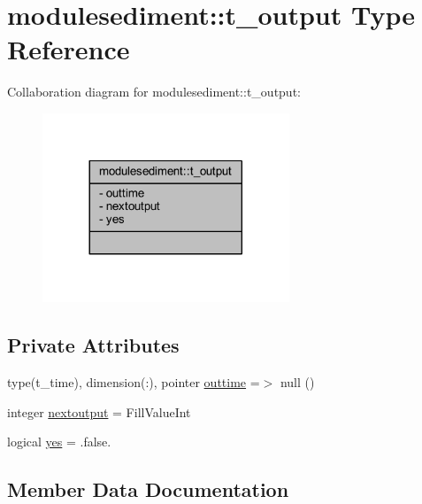 \hypertarget{structmodulesediment_1_1t__output}{}\section{modulesediment\+:\+:t\+\_\+output Type Reference}
\label{structmodulesediment_1_1t__output}


Collaboration diagram for modulesediment\+:\+:t\+\_\+output\+:\nopagebreak
\begin{figure}[H]
\begin{center}
\leavevmode
\includegraphics[width=209pt]{structmodulesediment_1_1t__output__coll__graph}
\end{center}
\end{figure}
\subsection*{Private Attributes}
\begin{DoxyCompactItemize}
\item 
type(t\+\_\+time), dimension(\+:), pointer \mbox{\hyperlink{structmodulesediment_1_1t__output_a1cd979d34cf8f4ee4afcbef5566acf6d}{outtime}} =$>$ null ()
\item 
integer \mbox{\hyperlink{structmodulesediment_1_1t__output_a9c4b08007adb655b8633ee973eb7d605}{nextoutput}} = Fill\+Value\+Int
\item 
logical \mbox{\hyperlink{structmodulesediment_1_1t__output_a8f7bdcfd69bbf8d652fb9cc410242c65}{yes}} = .false.
\end{DoxyCompactItemize}


\subsection{Member Data Documentation}
\mbox{\label{structmodulesediment_1_1t__output_a9c4b08007adb655b8633ee973eb7d605}} 
